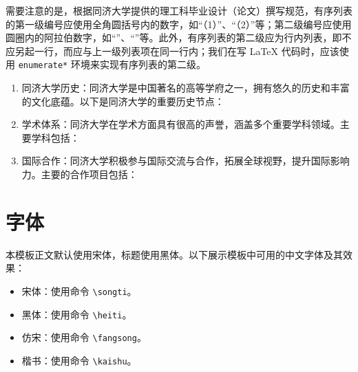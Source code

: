 需要注意的是，根据同济大学提供的理工科毕业设计（论文）撰写规范，有序列表的第一级编号应使用全角圆括号内的数字，如“（1）”、“（2）”等；第二级编号应使用圆圈内的阿拉伯数字，如“”、“”等。此外，有序列表的第二级应为行内列表，即不应另起一行，而应与上一级列表项在同一行内；我们在写 \LaTeX{} 代码时，应该使用 \texttt{enumerate*} 环境来实现有序列表的第二级。

\begin{enumerate}
    \item 同济大学历史：同济大学是中国著名的高等学府之一，拥有悠久的历史和丰富的文化底蕴。以下是同济大学的重要历史节点：
    \item 学术体系：同济大学在学术方面具有很高的声誉，涵盖多个重要学科领域。主要学科包括：
    \item 国际合作：同济大学积极参与国际交流与合作，拓展全球视野，提升国际影响力。主要的合作项目包括：
\end{enumerate}

\section{字体}

本模板正文默认使用宋体，标题使用黑体。以下展示模板中可用的中文字体及其效果：

\begin{itemize}
    \item {\songti 宋体}：使用命令 \texttt{\textbackslash songti}。
    \item {\heiti 黑体}：使用命令 \texttt{\textbackslash heiti}。
    \item {\fangsong 仿宋}：使用命令 \texttt{\textbackslash fangsong}。
    \item {\kaishu 楷书}：使用命令 \texttt{\textbackslash kaishu}。
\end{itemize}

